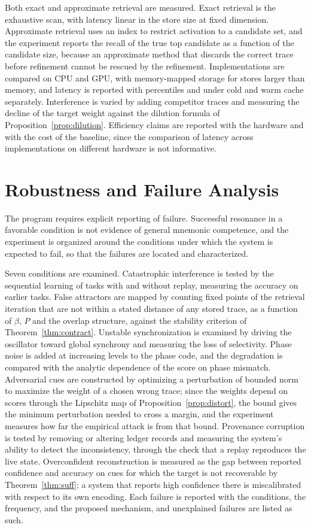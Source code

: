 Both exact and approximate retrieval are measured. Exact retrieval is the exhaustive scan, with latency linear in the store size at fixed dimension. Approximate retrieval uses an index to restrict activation to a candidate set, and the experiment reports the recall of the true top candidate as a function of the candidate size, because an approximate method that discards the correct trace before refinement cannot be rescued by the refinement. Implementations are compared on CPU and GPU, with memory-mapped storage for stores larger than memory, and latency is reported with percentiles and under cold and warm cache separately. Interference is varied by adding competitor traces and measuring the decline of the target weight against the dilution formula of Proposition~\ref{prop:dilution}. Efficiency claims are reported with the hardware and with the cost of the baseline, since the comparison of latency across implementations on different hardware is not informative.

\chapter{Robustness and Failure Analysis}\label{ch:failure}

The program requires explicit reporting of failure. Successful resonance in a favorable condition is not evidence of general mnemonic competence, and the experiment is organized around the conditions under which the system is expected to fail, so that the failures are located and characterized.

Seven conditions are examined. Catastrophic interference is tested by the sequential learning of tasks with and without replay, measuring the accuracy on earlier tasks. False attractors are mapped by counting fixed points of the retrieval iteration that are not within a stated distance of any stored trace, as a function of $\beta$, $P$ and the overlap structure, against the stability criterion of Theorem~\ref{thm:contract}. Unstable synchronization is examined by driving the oscillator toward global synchrony and measuring the loss of selectivity. Phase noise is added at increasing levels to the phase code, and the degradation is compared with the analytic dependence of the score on phase mismatch. Adversarial cues are constructed by optimizing a perturbation of bounded norm to maximize the weight of a chosen wrong trace; since the weights depend on scores through the Lipschitz map of Proposition~\ref{prop:distort}, the bound gives the minimum perturbation needed to cross a margin, and the experiment measures how far the empirical attack is from that bound. Provenance corruption is tested by removing or altering ledger records and measuring the system's ability to detect the inconsistency, through the check that a replay reproduces the live state. Overconfident reconstruction is measured as the gap between reported confidence and accuracy on cues for which the target is not recoverable by Theorem~\ref{thm:suff}; a system that reports high confidence there is miscalibrated with respect to its own encoding. Each failure is reported with the conditions, the frequency, and the proposed mechanism, and unexplained failures are listed as such.
